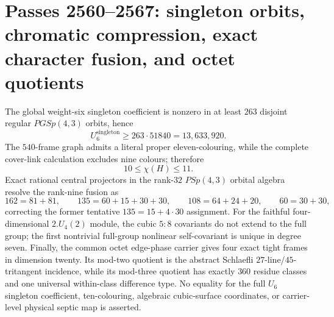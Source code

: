 \section*{Passes 2560--2567: singleton orbits, chromatic compression, exact character fusion, and octet quotients}
The global weight-six singleton coefficient is nonzero in at least $263$ disjoint regular $PGSp(4,3)$ orbits, hence
\[
U_6^{\mathrm{singleton}}\ge 263\cdot 51840=13{,}633{,}920.
\]
The $540$-frame graph admits a literal proper eleven-colouring, while the complete cover-link calculation excludes nine colours; therefore
\[
10\le \chi(H)\le 11.
\]
Exact rational central projectors in the rank-$32$ $PSp(4,3)$ orbital algebra resolve the rank-nine fusion as
\[
162=81+81,\qquad135=60+15+30+30,\qquad108=64+24+20,\qquad60=30+30,
\]
correcting the former tentative $135=15+4\cdot30$ assignment.
For the faithful four-dimensional $2.U_4(2)$ module, the cubic $5{:}8$ covariants do not extend to the full group; the first nontrivial full-group nonlinear self-covariant is unique in degree seven.
Finally, the common octet edge-phase carrier gives four exact tight frames in dimension twenty. Its mod-two quotient is the abstract Schlaefli $27$-line/$45$-tritangent incidence, while its mod-three quotient has exactly $360$ residue classes and one universal within-class difference type. No equality for the full $U_6$ singleton coefficient, ten-colouring, algebraic cubic-surface coordinates, or carrier-level physical septic map is asserted.
